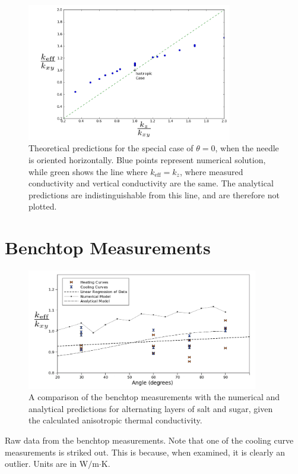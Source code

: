 \begin{figure}[h]
\centering
\includegraphics[width=0.8\textwidth]{fig/angle_0.png}
\caption{Theoretical predictions for the special case of \(\theta = 0 \),
when the needle is oriented horizontally. Blue points represent numerical solution, while green shows the line where \(k_{\textrm{eff}} = k_z\), where measured conductivity and vertical conductivity are the same. The analytical predictions are indistinguishable from this line, and are therefore not plotted.}
\label{fig:angle0}
\end{figure}


\section{Benchtop Measurements}

\begin{figure}[h]
\centering
\includegraphics[width=0.9\textwidth]{fig/test_results.png}
\caption{A comparison of the benchtop measurements with the numerical and
analytical predictions for alternating layers of salt and sugar, given the
calculated anisotropic thermal conductivity.}
\label{fig:test_results}
\end{figure}

\begin{table}[h]
\centering
\caption{Raw data from the benchtop measurements. Note that one of the cooling curve measurements is striked out. This is because, when examined, it is clearly an outlier. Units are in W\(/\)m\(\cdot\)K.}

\label{tab:powders}
\end{table}



